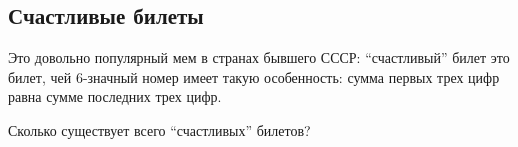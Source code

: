 \subsection{Счастливые билеты}

Это довольно популярный мем в странах бывшего СССР: ``счастливый'' билет это билет, чей 6-значный номер имеет такую особенность:
сумма первых трех цифр равна сумме последних трех цифр.

Сколько существует всего ``счастливых'' билетов?



